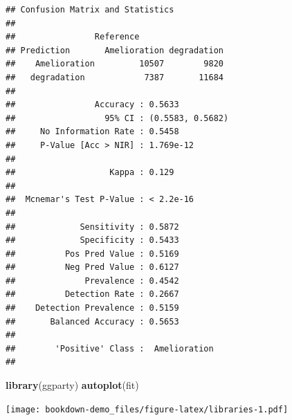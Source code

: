 \documentclass[
]{book}
\newenvironment{Shaded}{\begin{snugshade}}{\end{snugshade}}
\newcommand{\CommentTok}[1]{\textcolor[rgb]{0.56,0.35,0.01}{\textit{#1}}}
\newcommand{\KeywordTok}[1]{\textcolor[rgb]{0.13,0.29,0.53}{\textbf{#1}}}
\newcommand{\NormalTok}[1]{#1}
\newcommand{\OperatorTok}[1]{\textcolor[rgb]{0.81,0.36,0.00}{\textbf{#1}}}
\newcommand{\StringTok}[1]{\textcolor[rgb]{0.31,0.60,0.02}{#1}}
\begin{document}
\begin{Shaded}
\end{Shaded}

\begin{verbatim}
## Confusion Matrix and Statistics
## 
##                Reference
## Prediction       Amelioration degradation
##    Amelioration         10507        9820
##   degradation            7387       11684
##                                           
##                Accuracy : 0.5633          
##                  95% CI : (0.5583, 0.5682)
##     No Information Rate : 0.5458          
##     P-Value [Acc > NIR] : 1.769e-12       
##                                           
##                   Kappa : 0.129           
##                                           
##  Mcnemar's Test P-Value : < 2.2e-16       
##                                           
##             Sensitivity : 0.5872          
##             Specificity : 0.5433          
##          Pos Pred Value : 0.5169          
##          Neg Pred Value : 0.6127          
##              Prevalence : 0.4542          
##          Detection Rate : 0.2667          
##    Detection Prevalence : 0.5159          
##       Balanced Accuracy : 0.5653          
##                                           
##        'Positive' Class :  Amelioration   
## 
\end{verbatim}

\begin{Shaded}
\begin{Highlighting}[]
\KeywordTok{library}\NormalTok{(ggparty)}
\KeywordTok{autoplot}\NormalTok{(fit)}
\end{Highlighting}
\end{Shaded}

\texttt{[image: bookdown-demo\_files/figure-latex/libraries-1.pdf]}

\begin{Shaded}
\end{Shaded}
\end{document}
